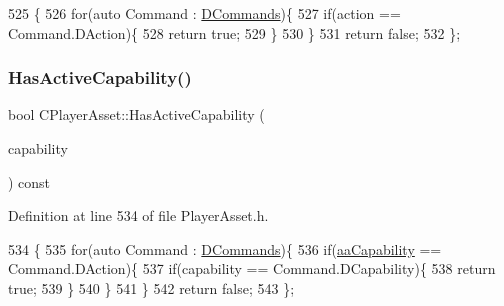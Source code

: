 \begin{DoxyCode}
525                                                  \{
526             \textcolor{keywordflow}{for}(\textcolor{keyword}{auto} Command : \hyperlink{classCPlayerAsset_a4d3b96106d3b1c1020f98005884d2a87}{DCommands})\{
527                 \textcolor{keywordflow}{if}(action == Command.DAction)\{
528                     \textcolor{keywordflow}{return} \textcolor{keyword}{true};   
529                 \}
530             \}
531             \textcolor{keywordflow}{return} \textcolor{keyword}{false};
532         \};
\end{DoxyCode}
\hypertarget{classCPlayerAsset_a6502fe94b663fb3729086ffad530d5ca}{}\label{classCPlayerAsset_a6502fe94b663fb3729086ffad530d5ca} 
\subsubsection{\texorpdfstring{Has\+Active\+Capability()}{HasActiveCapability()}}
{\footnotesize\ttfamily bool C\+Player\+Asset\+::\+Has\+Active\+Capability (\begin{DoxyParamCaption}\item[{\hyperlink{GameDataTypes_8h_a35b98ce26aca678b03c6f9f76e4778ce}{E\+Asset\+Capability\+Type}}]{capability }\end{DoxyParamCaption}) const\hspace{0.3cm}{\ttfamily [inline]}}



Definition at line 534 of file Player\+Asset.\+h.


\begin{DoxyCode}
534                                                                        \{
535             \textcolor{keywordflow}{for}(\textcolor{keyword}{auto} Command : \hyperlink{classCPlayerAsset_a4d3b96106d3b1c1020f98005884d2a87}{DCommands})\{
536                 \textcolor{keywordflow}{if}(\hyperlink{GameDataTypes_8h_ab47668e651a3032cfb9c40ea2d60d670acf9fb164e8abd71c71f4a8c7fda360d4}{aaCapability} == Command.DAction)\{
537                     \textcolor{keywordflow}{if}(capability == Command.DCapability)\{
538                         \textcolor{keywordflow}{return} \textcolor{keyword}{true};
539                     \}
540                 \}
541             \}
542             \textcolor{keywordflow}{return} \textcolor{keyword}{false};
543         \};
\end{DoxyCode}
\hypertarget{classCPlayerAsset_ac01bc82d9b4cc54a72cb092fa1368663}{}\label{classCPlayerAsset_ac01bc82d9b4cc54a72cb092fa1368663} 
